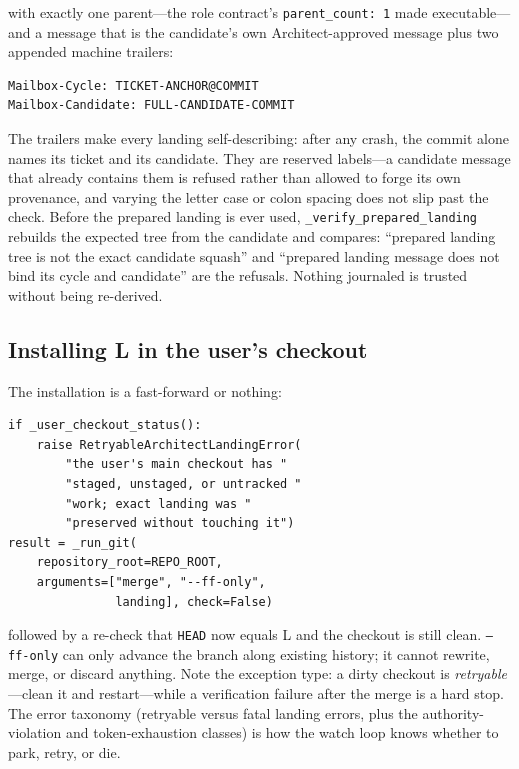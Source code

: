 \documentclass[10pt,aps,prd,twocolumn,nofootinbib]{revtex4-2}
\newcommand{\code}[1]{\texttt{#1}}
\begin{document}
\noindent with exactly one parent---the role contract's
\code{parent\_count: 1} made executable---and a message that is the
candidate's own Architect-approved message plus two appended machine
trailers:

\begin{verbatim}
Mailbox-Cycle: TICKET-ANCHOR@COMMIT
Mailbox-Candidate: FULL-CANDIDATE-COMMIT
\end{verbatim}

The trailers make every landing self-describing: after any crash, the
commit alone names its ticket and its candidate.  They are reserved
labels---a candidate message that already contains them is refused
rather than allowed to forge its own provenance, and varying the
letter case or colon spacing does not slip past the check.  Before the
prepared landing is ever used, \code{\_verify\_prepared\_landing}
rebuilds the expected tree from the candidate and compares: ``prepared
landing tree is not the exact candidate squash'' and ``prepared
landing message does not bind its cycle and candidate'' are the
refusals.  Nothing journaled is trusted without being re-derived.

\subsection{Installing L in the user's checkout}

The installation is a fast-forward or nothing:

\begin{verbatim}
if _user_checkout_status():
    raise RetryableArchitectLandingError(
        "the user's main checkout has "
        "staged, unstaged, or untracked "
        "work; exact landing was "
        "preserved without touching it")
result = _run_git(
    repository_root=REPO_ROOT,
    arguments=["merge", "--ff-only",
               landing], check=False)
\end{verbatim}

\noindent followed by a re-check that \code{HEAD} now equals L and the
checkout is still clean.  \code{--ff-only} can only advance the branch
along existing history; it cannot rewrite, merge, or discard anything.
Note the exception type: a dirty checkout is \emph{retryable}---clean
it and restart---while a verification failure after the merge is a
hard stop.  The error taxonomy (retryable versus fatal landing errors,
plus the authority-violation and token-exhaustion classes) is how the
watch loop knows whether to park, retry, or die.
\end{document}
